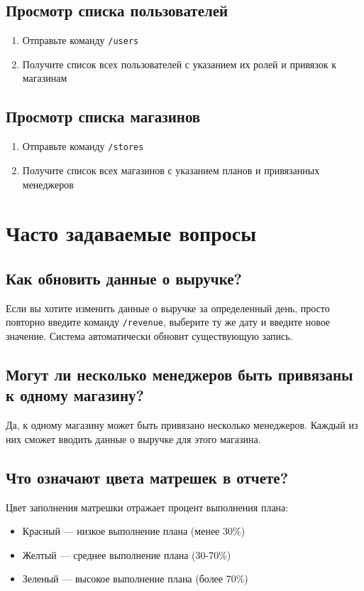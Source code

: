 \documentclass[a4paper,12pt]{article}
\begin{document}
\subsection{Просмотр списка пользователей}
\begin{enumerate}
    \item Отправьте команду \texttt{/users}
    \item Получите список всех пользователей с указанием их ролей и привязок к магазинам
\end{enumerate}

\subsection{Просмотр списка магазинов}
\begin{enumerate}
    \item Отправьте команду \texttt{/stores}
    \item Получите список всех магазинов с указанием планов и привязанных менеджеров
\end{enumerate}

\section{Часто задаваемые вопросы}

\subsection{Как обновить данные о выручке?}
Если вы хотите изменить данные о выручке за определенный день, просто повторно введите команду \texttt{/revenue}, выберите ту же дату и введите новое значение. Система автоматически обновит существующую запись.

\subsection{Могут ли несколько менеджеров быть привязаны к одному магазину?}
Да, к одному магазину может быть привязано несколько менеджеров. Каждый из них сможет вводить данные о выручке для этого магазина.

\subsection{Что означают цвета матрешек в отчете?}
Цвет заполнения матрешки отражает процент выполнения плана:
\begin{itemize}
    \item Красный — низкое выполнение плана (менее 30\%)
    \item Желтый — среднее выполнение плана (30-70\%)
    \item Зеленый — высокое выполнение плана (более 70\%)
\end{itemize}
\end{document}
